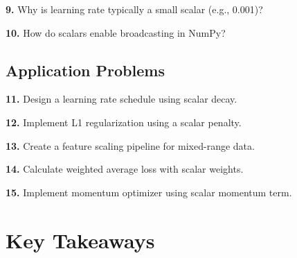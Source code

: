 \documentclass[11pt,a4paper]{article}
\begin{document}
\textbf{9.} Why is learning rate typically a small scalar (e.g., 0.001)?

\textbf{10.} How do scalars enable broadcasting in NumPy?

\subsection{Application Problems}

\textbf{11.} Design a learning rate schedule using scalar decay.

\textbf{12.} Implement L1 regularization using a scalar penalty.

\textbf{13.} Create a feature scaling pipeline for mixed-range data.

\textbf{14.} Calculate weighted average loss with scalar weights.

\textbf{15.} Implement momentum optimizer using scalar momentum term.

\section{Key Takeaways}
\end{document}
